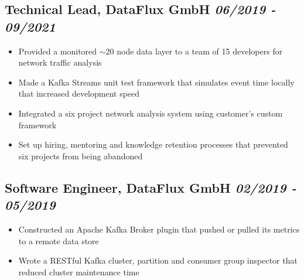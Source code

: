 \documentclass[a4paper]{article}
\newcommand{\bolditalicpair}
[2]
{\textbf{#1} \texorpdfstring{\hfill}{} \textit{#2}}
\begin{document}
\subsection{\bolditalicpair{Technical Lead, DataFlux GmbH}{06/2019 - 09/2021}}

\begin{itemize}
 \item Provided a monitored $\sim$20 node data layer to a team of 15 developers for network traffic analysis
 \item Made a Kafka Streams unit test framework that simulates event time locally that increased development speed
 \item Integrated a six project network analysis system using customer's custom framework
 \item Set up hiring, mentoring and knowledge retention processes that prevented six projects from being abandoned
\end{itemize}

\subsection{\bolditalicpair{Software Engineer, DataFlux GmbH}{02/2019 - 05/2019}}

\begin{itemize}
  \item Constructed an Apache Kafka Broker plugin that pushed or pulled its metrics to a remote data store
  \item Wrote a RESTful Kafka cluster, partition and consumer group inspector that reduced cluster maintenance time
\end{itemize}


\end{document}

